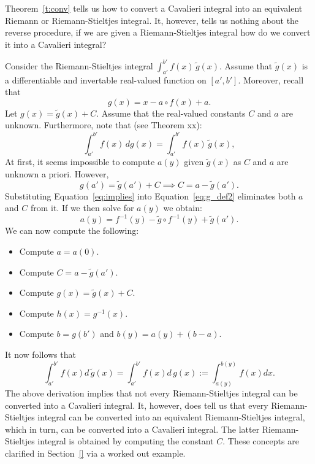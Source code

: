\documentclass[twoside,reqno,11pt]{fcaa-var} %
\begin{document}
Theorem~\ref{t:conv} tells us how to convert a Cavalieri integral into an equivalent Riemann or Riemann-Stieltjes integral. It, however, tells us nothing about the reverse 
procedure, if we are given a Riemann-Stieltjes integral how do we convert it into a Cavalieri integral? 

Consider the Riemann-Stieltjes integral $\int_{a'}^{b'} f(x)\,\widetilde{g}(x)$. Assume that $\widetilde{g}(x)$ is a differentiable and invertable real-valued function on $[a',b']$. Moreover, recall that 
\begin{equation}
\label{eq:g_def2}
g(x) = x - a\circ f(x) + a.
\end{equation}
Let $g(x) = \widetilde{g}(x) + C$. Assume that the real-valued constants $C$ and $a$ are unknown. Furthermore, note that (see Theorem xx):
\begin{equation}
\int_{a'}^{b'} f(x)\,dg(x) = \int_{a'}^{b'}f(x)\,\widetilde{g}(x), 
\end{equation}
At first, it seems impossible to compute $a(y)$ given $\widetilde{g}(x)$ as $C$ and $a$ are unknown a priori. However, 
\begin{equation}
\label{eq:implies}
g(a') = \widetilde{g}(a') + C \implies C = a - \widetilde{g}(a'). 
\end{equation}
Substituting Equation~\eqref{eq:implies} into Equation~\eqref{eq:g_def2} eliminates
both $a$ and $C$ from it. If we then solve for $a(y)$ we obtain:
\begin{equation}
a(y) = f^{-1}(y)-\widetilde{g}\circ f^{-1}(y) + \widetilde{g}(a'). 
\end{equation}
We can now compute the following:
\begin{itemize}
\item Compute $a = a(0)$.
\item Compute $C = a - \widetilde{g}(a')$.
\item Compute $g(x) = \widetilde{g}(x) + C$.
\item Compute $h(x) = g^{-1}(x)$.
\item Compute $b = g(b')$ and $b(y) = a(y) + (b-a)$.
\end{itemize}
It now follows that 
\begin{equation}
\int_{a'}^{b'} f(x)d\,\widetilde{g}(x) = \int_{a'}^{b'} f(x)d\,g(x):=\int_{a(y)}^{b(y)}f(x)dx. 
\end{equation}
The above derivation implies that not every Riemann-Stieltjes integral can be converted into a Cavalieri integral. It, however, does tell us that every Riemann-Stieltjes integral can be converted into an equivalent Riemann-Stieltjes integral, which in turn, can be converted into a Cavalieri integral. The latter Riemann-Stieltjes integral is obtained by computing the constant $C$. These concepts are clarified in Section~\ref{} via a worked out example. 
\end{document}
